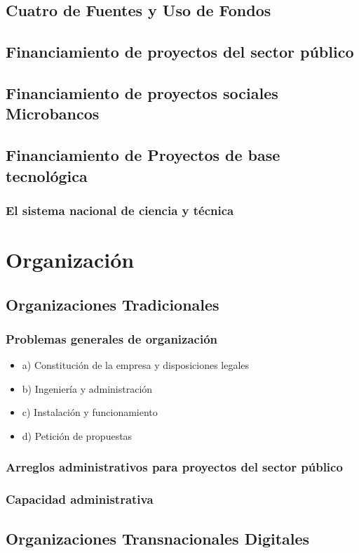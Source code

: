 \documentclass[crop=false]{standalone}
\begin{document}
\subsection{Cuatro de Fuentes y Uso de Fondos}

\subsection{Financiamiento de proyectos del sector público}
\subsection{Financiamiento de proyectos sociales Microbancos}
\subsection{Financiamiento de Proyectos de base tecnológica}
\subsubsection{El sistema nacional de ciencia y técnica}

\section{Organización}

\subsection{Organizaciones Tradicionales}

\subsubsection{ Problemas generales de organización}
\begin{itemize}
    \item a) Constitución de la empresa y disposiciones legales
    \item b) Ingeniería y administración
    \item c) Instalación y funcionamiento
    \item d) Petición de propuestas
\end{itemize}

\subsubsection{Arreglos administrativos para proyectos del sector público}

\subsubsection{Capacidad administrativa}



\subsection{Organizaciones Transnacionales Digitales}




\end{document}
